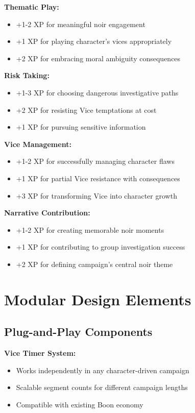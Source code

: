\documentclass[11pt]{article}
\begin{document}
\textbf{Thematic Play:}
\begin{itemize}
\item +1-2 XP for meaningful noir engagement
\item +1 XP for playing character's vices appropriately
\item +2 XP for embracing moral ambiguity consequences
\end{itemize}

\textbf{Risk Taking:}
\begin{itemize}
\item +1-3 XP for choosing dangerous investigative paths
\item +2 XP for resisting Vice temptations at cost
\item +1 XP for pursuing sensitive information
\end{itemize}

\textbf{Vice Management:}
\begin{itemize}
\item +1-2 XP for successfully managing character flaws
\item +1 XP for partial Vice resistance with consequences
\item +3 XP for transforming Vice into character growth
\end{itemize}

\textbf{Narrative Contribution:}
\begin{itemize}
\item +1-2 XP for creating memorable noir moments
\item +1 XP for contributing to group investigation success
\item +2 XP for defining campaign's central noir theme
\end{itemize}

\section{Modular Design Elements}

\subsection{Plug-and-Play Components}

\textbf{Vice Timer System:}
\begin{itemize}
\item Works independently in any character-driven campaign
\item Scalable segment counts for different campaign lengths
\item Compatible with existing Boon economy
\end{itemize}
\end{document}
